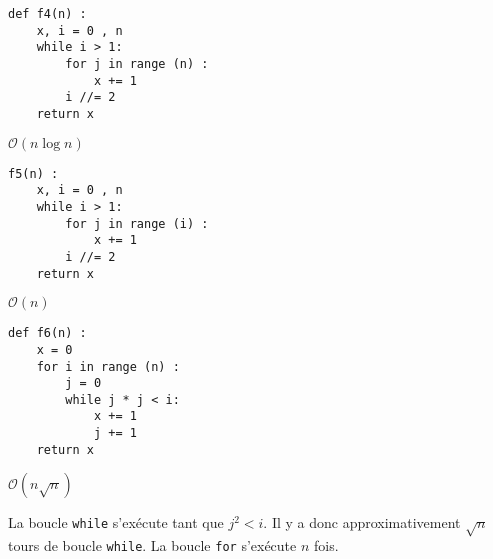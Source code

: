 \begin{lstlisting}
def f4(n) :
    x, i = 0 , n
    while i > 1:
        for j in range (n) :
            x += 1
        i //= 2
    return x
\end{lstlisting}
\ifprof
\begin{corrige}
$\mathcal{O}(n \log n)$
\end{corrige}
\else
\fi



\begin{lstlisting}
f5(n) :
    x, i = 0 , n
    while i > 1:
        for j in range (i) :
            x += 1
        i //= 2
    return x
\end{lstlisting}
\ifprof
\begin{corrige}
$\mathcal{O}( n)$
\end{corrige}
\else
\fi



\begin{lstlisting}
def f6(n) :
    x = 0
    for i in range (n) :
        j = 0
        while j * j < i:
            x += 1
            j += 1
    return x
\end{lstlisting}
\ifprof
\begin{corrige}
$\mathcal{O}( n\sqrt{n})$


La boucle \lstinline{while} s'exécute tant que $j^2<i$. Il y a donc approximativement $\sqrt{n}$ tours de boucle \lstinline{while}. 
La boucle \lstinline{for} s'exécute $n$ fois.
\end{corrige}
\else

\fi


